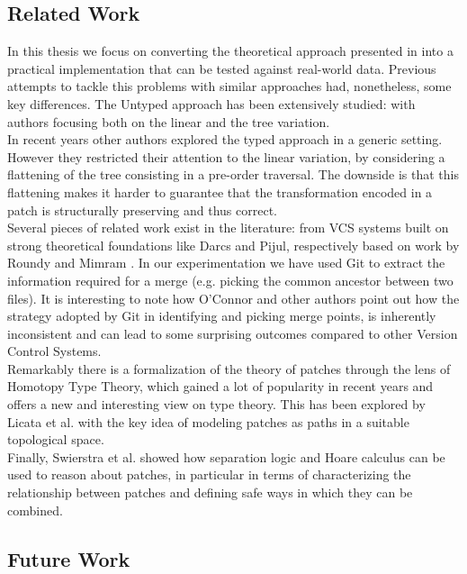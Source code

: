 \documentclass[11pt, titlepage]{article}
\begin{document}
\subsection{Related Work}\label{rel-work}
In this thesis we focus on converting the theoretical approach presented in \cite{type-directed-diff} into a practical implementation that can be tested against real-world data. Previous attempts to tackle this problems with similar approaches had, nonetheless, some key differences. 
The Untyped approach has been extensively studied: with authors focusing both on the linear \cite{diff, bergroth} and the tree \cite{Akutsu, klein,demanie, billie, autexier, chawalthe} variation. 
\\
In recent years other authors explored the typed approach \cite{Vassena, Lempsink} in a generic setting. However they restricted their attention to the linear variation, by considering a flattening of the tree consisting in a pre-order traversal. The downside is that this flattening makes it harder to guarantee that the transformation encoded in a patch is structurally preserving and thus correct.
\\
Several pieces of related work exist in the literature: from VCS systems built on strong theoretical foundations like Darcs and Pijul, respectively based on work by Roundy \cite{darcs} and Mimram \cite{cat-of-patches}. In our experimentation we have used Git to extract the information required for a merge (e.g. picking the common ancestor between two files). It is interesting to note how O'Connor \cite{git-inconsistent} and other authors point out how the strategy adopted by Git in identifying and picking merge points, is inherently inconsistent and can lead to some surprising outcomes compared to other Version Control Systems.
\\
Remarkably there is a formalization of the theory of patches through the lens of Homotopy Type Theory, which gained a lot of popularity in recent years and offers a new and interesting view on type theory. This has been explored by Licata et al. \cite{HPT} with the key idea of modeling patches as paths in a suitable topological space. 
\\
Finally, Swierstra et al. \cite{semantics-VC} showed how separation logic and Hoare calculus can be used to reason about patches, in particular in terms of characterizing the relationship between patches and defining safe ways in which they can be combined.

\subsection{Future Work}\label{fut-work}
\end{document}

